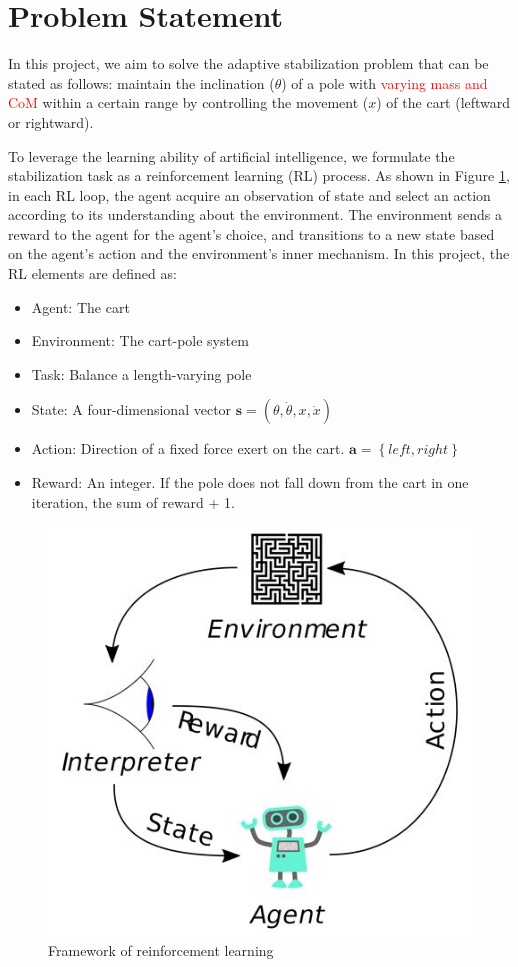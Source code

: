 \documentclass[10pt,a4paper]{article}
\begin{document}
\section{Problem Statement}
In this project, we aim to solve the adaptive stabilization problem that can be stated as follows: maintain the inclination ($\theta$) of a pole with \textcolor{red}{varying mass and CoM} within a certain range by controlling the movement ($x$) of the cart (leftward or rightward).

To leverage the learning ability of artificial intelligence, we formulate the stabilization task as a reinforcement learning (RL) process. As shown in Figure \ref{fig:rl}, in each RL loop, the agent acquire an observation of state and select an action according to its understanding about the environment. The environment sends a reward to  the agent for the agent's choice, and transitions to a new state based on the agent's action and the environment's inner mechanism. In this project, the RL elements are defined as:

\begin{itemize}
	\item Agent: The cart
	\item Environment: The cart-pole system
	\item Task: Balance a length-varying pole
	\item State: A four-dimensional vector $\boldsymbol{s} = (\theta, \dot{\theta}, x, \dot{x})$
	\item Action: Direction of a fixed force exert on the cart. $\boldsymbol{a} = \left\{ left, right\right\}$
	\item Reward: An integer. If the pole does not fall down from the cart in one iteration, the sum of reward + 1. 
\end{itemize}



 
\begin{figure}
\centering
\includegraphics[width=0.3\linewidth]{figure/rl}
\caption{Framework of reinforcement learning}
\label{fig:rl}
\end{figure}
\end{document}
